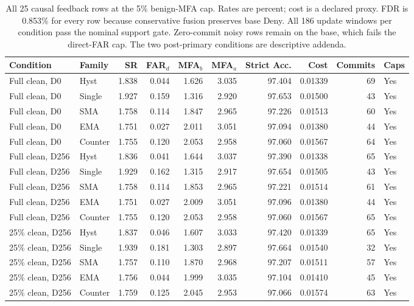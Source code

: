 \begin{table}[!htbp]
\centering
\caption{All 25 causal feedback rows at the 5\% benign-MFA cap. Rates are percent; cost is a declared proxy. FDR is 0.853\% for every row because conservative fusion preserves base Deny. All 186 update windows per condition pass the nominal support gate. Zero-commit noisy rows remain on the base, which fails the direct-FAR cap. The two post-primary conditions are descriptive addenda.}
\label{tab:supp_dynamic_5}
\scriptsize
\setlength{\tabcolsep}{3pt}
\begin{tabular}{llrrrrrrrl}
\toprule
Condition & Family & SR & FAR$_d$ & MFA$_b$ & MFA$_a$ & Strict Acc. & Cost & Commits & Caps\\
\midrule
Full clean, D0 & Hyst & 1.838 & 0.044 & 1.626 & 3.035 & 97.404 & 0.01339 & 69 & Yes \\
Full clean, D0 & Single & 1.927 & 0.159 & 1.316 & 2.920 & 97.653 & 0.01500 & 43 & Yes \\
Full clean, D0 & SMA & 1.758 & 0.114 & 1.847 & 2.965 & 97.226 & 0.01513 & 60 & Yes \\
Full clean, D0 & EMA & 1.751 & 0.027 & 2.011 & 3.051 & 97.094 & 0.01380 & 44 & Yes \\
Full clean, D0 & Counter & 1.755 & 0.120 & 2.053 & 2.958 & 97.060 & 0.01567 & 64 & Yes \\
Full clean, D256 & Hyst & 1.836 & 0.041 & 1.644 & 3.037 & 97.390 & 0.01338 & 65 & Yes \\
Full clean, D256 & Single & 1.929 & 0.162 & 1.315 & 2.917 & 97.654 & 0.01505 & 43 & Yes \\
Full clean, D256 & SMA & 1.758 & 0.114 & 1.853 & 2.965 & 97.221 & 0.01514 & 61 & Yes \\
Full clean, D256 & EMA & 1.751 & 0.027 & 2.009 & 3.051 & 97.096 & 0.01380 & 44 & Yes \\
Full clean, D256 & Counter & 1.755 & 0.120 & 2.053 & 2.958 & 97.060 & 0.01567 & 65 & Yes \\
25\% clean, D256 & Hyst & 1.837 & 0.046 & 1.607 & 3.033 & 97.420 & 0.01339 & 65 & Yes \\
25\% clean, D256 & Single & 1.939 & 0.181 & 1.303 & 2.897 & 97.664 & 0.01540 & 32 & Yes \\
25\% clean, D256 & SMA & 1.757 & 0.110 & 1.870 & 2.968 & 97.207 & 0.01511 & 57 & Yes \\
25\% clean, D256 & EMA & 1.756 & 0.044 & 1.999 & 3.035 & 97.104 & 0.01410 & 45 & Yes \\
25\% clean, D256 & Counter & 1.759 & 0.125 & 2.045 & 2.953 & 97.066 & 0.01574 & 63 & Yes \\

\end{tabular}
\end{table}
